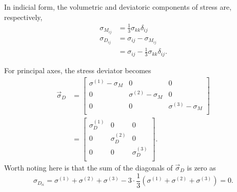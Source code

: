 In indicial form, the volumetric and deviatoric components of stress are, respectively,
\begin{align*}
  \sigma_{M_{ij}} &= \frac{1}{3} \sigma_{kk} \delta_{ij} \\
  \sigma_{D_{ij}} &= \sigma_{ij} - \sigma_{M_{ij}} \\
  &= \sigma_{ij} - \frac{1}{3} \sigma_{kk} \delta_{ij}
.\end{align*}

For principal axes, the stress deviator becomes
\begin{align*}
  \Vec{\sigma}_D &= \begin{bmatrix}
    \sigma^{(1)} - \sigma_M & 0 & 0\\
  0 & \sigma^{(2)} - \sigma_M & 0\\
  0 & 0 & \sigma^{(3)} - \sigma_M\\
  \end{bmatrix} \\
                 &= \begin{bmatrix}
                   \sigma_D^{(1)} & 0 & 0\\
                 0 & \sigma_{D}^{(2)} & 0\\
                 0 & 0 & \sigma_D^{(3)}\\
                 \end{bmatrix}
.\end{align*}
Worth noting here is that the sum of the diagonals of $\Vec{\sigma}_D$ is zero as
\begin{equation*}
  \sigma_{D_{ii}} = \sigma^{(1)} + \sigma^{(2)} + \sigma^{(3)} - 3 \cdot \frac{1}{3} \left( \sigma^{(1)} + \sigma^{(2)} + \sigma^{(3)} \right) = 0
.\end{equation*}

